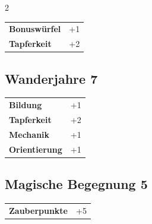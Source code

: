 \begin{multicols}{2}
\begin{tcolorbox}
\begin{tabular}{@{}ll@{}}
    \textbf{Bonuswürfel} & +1\\
    \textbf{Tapferkeit} & +2\\
\end{tabular}


\end{tcolorbox}

\begin{tcolorbox}
    \subsection*{Wanderjahre \hfill \small{7 }}
    \tcblower




\begin{tabular}{@{}ll@{}}
    \textbf{Bildung} & +1\\
    \textbf{Tapferkeit} & +2\\
    \textbf{Mechanik} & +1\\
    \textbf{Orientierung} & +1\\
\end{tabular}


\end{tcolorbox}

\begin{tcolorbox}
    \subsection*{Magische Begegnung \hfill \small{5 }}
    \tcblower




\begin{tabular}{@{}ll@{}}
    \textbf{Zauberpunkte} & +5\\
\end{tabular}


\end{tcolorbox}


\end{multicols}
